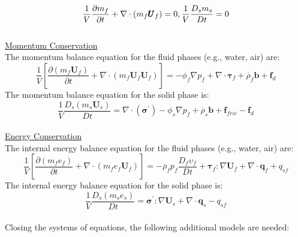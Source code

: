 \documentclass[preprint,12pt]{elsarticle}
\begin{document}
\begin{equation}
    \label{massbalance}
   \frac{1}{V}\frac{\partial m_f}{\partial t} + \nabla \cdot  (m_f \pmb{U}_f)= 0, \\ 
   \frac{1}{V}\frac{D_sm_s}{Dt} = 0    
\end {equation}
%
\underline{\hspace{5in}}\\
\underline{\textsf{Momentum Conservation}}\\
The momentum balance equation for the fluid phases (e.g., water, air) are:\\
%
%
\begin{equation}
     \frac{1}{V} \left[ \frac{\partial (m_f \pmb{U}_f)}{\partial t} + \nabla \cdot  (m_f \pmb{U}_f \pmb{U}_f) \right] = - \phi_f \nabla p_f  +  \nabla \cdot \pmb{\tau}_f + \overline{\rho}_f \pmb{b} +
     \pmb{f}_{d}
\end {equation}
%
%
The momentum balance equation for the solid phase is:\\
%
%
\begin{equation}
     \frac{1}{V}\frac{D_s(m_s \pmb{U}_s)}{Dt} = 
    \nabla \cdot (\pmb{\sigma}^\prime) - \phi_s \nabla p_f 
    + \overline{\rho}_s \pmb{b} + \pmb{f}_{fric}
    - \pmb{f}_{d}
\end {equation}
%
%
\underline{\hspace{5in}}\\
\underline{\textsf{Energy Conservation}}\\
The internal energy balance equation for the fluid phases (e.g., water, air) are:
%
%
\begin{equation}
    \label{fluidenergy}
     \frac{1}{V} \left[ \frac{\partial (m_f e_f)}{\partial t} + \nabla \cdot  (m_f e_f \pmb{U}_f) \right]  = 
    -\overline{\rho}_f p_f  \frac{D_f\upsilon_f}{Dt} + \pmb{\tau}_f : \nabla \pmb{U}_f + \nabla \cdot \pmb{q}_f + q_{sf}
\end {equation}
%
%
The internal energy balance equation for the solid phase is:
%
%
\begin{equation}
    \label{solidenergy}
     \frac{1}{V}\frac{D_s(m_s e_s)}{Dt} = \pmb{\sigma}^\prime:\nabla \pmb{U}_s + \nabla \cdot \pmb{q}_s - q_{sf} 
\end {equation}
%
%
\underline{\hspace{5in}}\\
Closing the systems of equations, the following additional models are needed: \\
\end{document}
